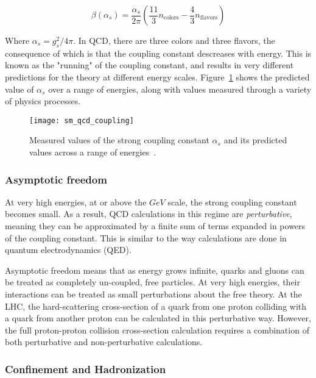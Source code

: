 \begin{equation}\label{eq:sm_qcd_beta}
    \beta\left(\alpha_s\right) = \frac{\alpha_s}{2\pi}\left(\frac{11}{3}n_{\text{colors}}-\frac{4}{3}n_{\text{flavors}}\right)
\end{equation}

Where $\alpha_s = g_s^2 / 4\pi$.
In QCD, there are three colors and three flavors, the consequence of which is that the coupling constant descreases with energy.
This is known as the "running" of the coupling constant, and results in very different predictions for the theory at different energy scales.
Figure~\ref{fig:sm_qcd_coupling} shows the predicted value of $\alpha_s$ over a range of energies,
along with values measured through a variety of physics processes.

\begin{figure}[!ht]
    \centering
\texttt{[image: sm\_qcd\_coupling]}
\caption{Measured values of the strong coupling constant $\alpha_s$ and its predicted values across a range of energies~\cite{sm-review-2014}.}
\label{fig:sm_qcd_coupling}
\end{figure}

\subsubsection{Asymptotic freedom}

At very high energies, at or above the $GeV$ scale, the strong coupling constant becomes small.
As a result, QCD calculations in this regime are \textit{perturbative},
meaning they can be approximated by a finite sum of terms expanded in powers of the coupling constant.
This is similar to the way calculations are done in quantum electrodynamics (QED).

Asymptotic freedom means that as energy grows infinite,
quarks and gluons can be treated as completely un-coupled, free particles.
At very high energies, their interactions can be treated as small perturbations about the free theory.
At the LHC, the hard-scattering cross-section of a quark from one proton colliding with a quark from another proton
can be calculated in this perturbative way.
However, the full proton-proton collision cross-section calculation requires a combination of both perturbative and non-perturbative calculations.

\subsubsection{Confinement and Hadronization}

